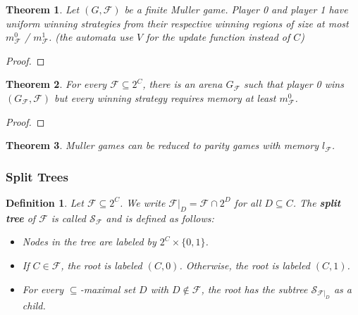 \documentclass{article}
\newtheorem{theorem}{Theorem}
\newtheorem{definition}{Definition}
\begin{document}
\vspace{0.5cm}
\begin{theorem}
	Let $(G, \mathcal{F})$ be a finite Muller game. Player 0 and player 1 have uniform winning strategies from their respective winning regions of size at most $m^0_\mathcal{F}$ / $m^1_\mathcal{F}$. (the automata use $V$ for the update function instead of $C$)
\end{theorem}
\begin{proof}
\end{proof}

\vspace{0.5cm}
\begin{theorem}
	For every $\mathcal{F} \subseteq 2^C$, there is an arena $G_\mathcal{F}$ such that player 0 wins $(G_\mathcal{F}, \mathcal{F})$ but every winning strategy requires memory at least $m^0_\mathcal{F}$.
\end{theorem}
\begin{proof}
\end{proof}

\vspace{0.5cm}
\begin{theorem}
	Muller games can be reduced to parity games with memory $l_\mathcal{F}$.
\end{theorem}

\subsubsection{Split Trees}
\begin{definition}
	Let $\mathcal{F} \subseteq 2^C$. We write $\mathcal{F}|_D = \mathcal{F} \cap 2^D$ for all $D \subseteq C$. The \textbf{split tree} of $\mathcal{F}$ is called $\mathcal{S}_\mathcal{F}$ and is defined as follows: 
	\begin{itemize}
		\item Nodes in the tree are labeled by $2^C \times \{0,1\}$.
		\item If $C \in \mathcal{F}$, the root is labeled $(C, 0)$. Otherwise, the root is labeled $(C, 1)$.
		\item For every $\subseteq$-maximal set $D$ with $D \notin \mathcal{F}$, the root has the subtree $\mathcal{S}_{\mathcal{F}|_D}$ as a child.
	\end{itemize}
\end{definition}
\end{document}
